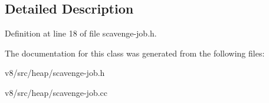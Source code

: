 \subsection{Detailed Description}


Definition at line 18 of file scavenge-\/job.\+h.



The documentation for this class was generated from the following files\+:\begin{DoxyCompactItemize}
\item 
v8/src/heap/scavenge-\/job.\+h\item 
v8/src/heap/scavenge-\/job.\+cc\end{DoxyCompactItemize}
